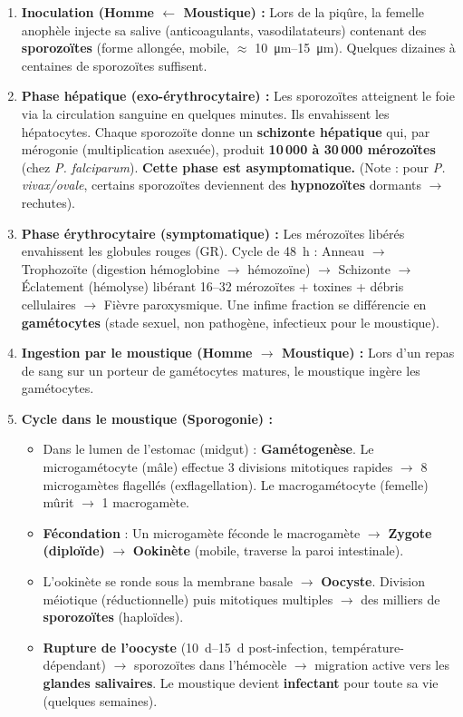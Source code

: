 \documentclass[11pt]{article}
\begin{document}
\begin{enumerate}
    \item \textbf{Inoculation (Homme $\leftarrow$ Moustique) :} Lors de la piqûre, la femelle anophèle injecte sa salive (anticoagulants, vasodilatateurs) contenant des \textbf{sporozoïtes} (forme allongée, mobile, $\approx$ \SI{10}{\micro\meter}--\SI{15}{\micro\meter}). Quelques dizaines à centaines de sporozoïtes suffisent.
    \item \textbf{Phase hépatique (exo-érythrocytaire) :} Les sporozoïtes atteignent le foie via la circulation sanguine en quelques minutes. Ils envahissent les hépatocytes. Chaque sporozoïte donne un \textbf{schizonte hépatique} qui, par mérogonie (multiplication asexuée), produit \textbf{10\,000 à 30\,000 mérozoïtes} (chez \emph{P. falciparum}). \textbf{Cette phase est asymptomatique.} (Note : pour \emph{P. vivax/ovale}, certains sporozoïtes deviennent des \textbf{hypnozoïtes} dormants $\to$ rechutes).
    \item \textbf{Phase érythrocytaire (symptomatique) :} Les mérozoïtes libérés envahissent les globules rouges (GR). Cycle de \SI{48}{\hour} : Anneau $\to$ Trophozoïte (digestion hémoglobine $\to$ hémozoïne) $\to$ Schizonte $\to$ Éclatement (hémolyse) libérant 16--32 mérozoïtes + toxines + débris cellulaires $\to$ Fièvre paroxysmique. Une infime fraction se différencie en \textbf{gamétocytes} (stade sexuel, non pathogène, infectieux pour le moustique).
    \item \textbf{Ingestion par le moustique (Homme $\to$ Moustique) :} Lors d'un repas de sang sur un porteur de gamétocytes matures, le moustique ingère les gamétocytes.
    \item \textbf{Cycle dans le moustique (Sporogonie) :}
    \begin{itemize}
        \item Dans le lumen de l'estomac (midgut) : \textbf{Gamétogenèse}. Le microgamétocyte (mâle) effectue 3 divisions mitotiques rapides $\to$ 8 microgamètes flagellés (exflagellation). Le macrogamétocyte (femelle) mûrit $\to$ 1 macrogamète.
        \item \textbf{Fécondation} : Un microgamète féconde le macrogamète $\to$ \textbf{Zygote (diploïde)} $\to$ \textbf{Ookinète} (mobile, traverse la paroi intestinale).
        \item L'ookinète se ronde sous la membrane basale $\to$ \textbf{Oocyste}. Division méiotique (réductionnelle) puis mitotiques multiples $\to$ des milliers de \textbf{sporozoïtes} (haploïdes).
        \item \textbf{Rupture de l'oocyste} (\SIrange{10}{15}{\day} post-infection, température-dépendant) $\to$ sporozoïtes dans l'hémocèle $\to$ migration active vers les \textbf{glandes salivaires}. Le moustique devient \textbf{infectant} pour toute sa vie (quelques semaines).
    \end{itemize}
\end{enumerate}
\end{document}
